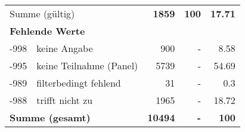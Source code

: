 \begin{longtable}{lXrrr}
     \midrule
     \multicolumn{2}{l}{Summe (gültig)} &
       \textbf{\num{1859}} &
     \textbf{\num{100}} &
       \textbf{\num[round-mode=places,round-precision=2]{17.71}} \\
     \multicolumn{5}{l}{\textbf{Fehlende Werte}}\\
       -998 &
       keine Angabe &
         \num{900} &
        - &
         \num[round-mode=places,round-precision=2]{8.58} \\
       -995 &
       keine Teilnahme (Panel) &
         \num{5739} &
        - &
         \num[round-mode=places,round-precision=2]{54.69} \\
       -989 &
       filterbedingt fehlend &
         \num{31} &
        - &
         \num[round-mode=places,round-precision=2]{0.3} \\
       -988 &
       trifft nicht zu &
         \num{1965} &
        - &
         \num[round-mode=places,round-precision=2]{18.72} \\
     \midrule
     \multicolumn{2}{l}{\textbf{Summe (gesamt)}} &
          \textbf{\num{10494}} &
        \textbf{-} &
        \textbf{\num{100}} \\
     \bottomrule
     \end{longtable}
     
